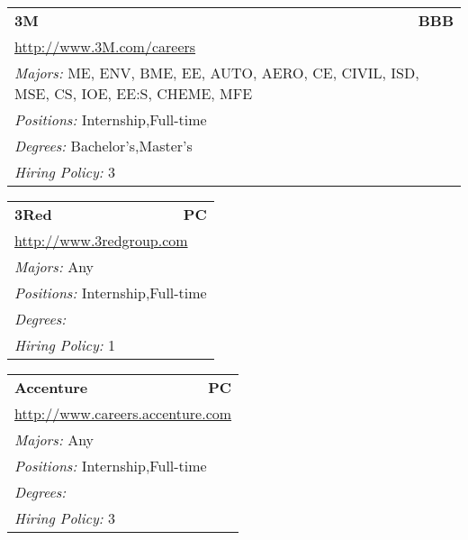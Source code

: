 \documentclass[twoside]{article}
\begin{document}
    \begin{center}\begin{multicols}{3}
    \begin{FlushLeft}
    \begin{minipage}{\columnwidth}\begin{tabularx}{.95\columnwidth}{Xr}
                 {\Large\bf 3M} & {\Large\bf BBB}\\
    \multicolumn{2}{p{.95\columnwidth}}{\url{http://www.3M.com/careers}}\\
    \multicolumn{2}{p{.95\columnwidth}}{\emph{Majors:} ME, ENV, BME, EE, AUTO, AERO, CE, CIVIL, ISD, MSE, CS, IOE, EE:S, CHEME, MFE}\\
    \multicolumn{2}{p{.95\columnwidth}}{\emph{Positions:} Internship,Full-time}\\
    \multicolumn{2}{p{.95\columnwidth}}{\emph{Degrees:} Bachelor's,Master's}\\
    \multicolumn{2}{p{.95\columnwidth}}{\emph{Hiring Policy:} 3}\\
    \end{tabularx}
    
\end{minipage}
 
\begin{minipage}{\columnwidth}\begin{tabularx}{.95\columnwidth}{Xr}
                 {\Large\bf 3Red} & {\Large\bf PC}\\
    \multicolumn{2}{p{.95\columnwidth}}{\url{http://www.3redgroup.com}}\\
    \multicolumn{2}{p{.95\columnwidth}}{\emph{Majors:} Any}\\
    \multicolumn{2}{p{.95\columnwidth}}{\emph{Positions:} Internship,Full-time}\\
    \multicolumn{2}{p{.95\columnwidth}}{\emph{Degrees:} }\\
    \multicolumn{2}{p{.95\columnwidth}}{\emph{Hiring Policy:} 1}\\
    \end{tabularx}
    
\end{minipage}
 
\begin{minipage}{\columnwidth}\begin{tabularx}{.95\columnwidth}{Xr}
                 {\Large\bf Accenture} & {\Large\bf PC}\\
    \multicolumn{2}{p{.95\columnwidth}}{\url{http://www.careers.accenture.com}}\\
    \multicolumn{2}{p{.95\columnwidth}}{\emph{Majors:} Any}\\
    \multicolumn{2}{p{.95\columnwidth}}{\emph{Positions:} Internship,Full-time}\\
    \multicolumn{2}{p{.95\columnwidth}}{\emph{Degrees:} }\\
    \multicolumn{2}{p{.95\columnwidth}}{\emph{Hiring Policy:} 3}\\
    \end{tabularx}
    

\end{minipage}
\end{FlushLeft}
\end{multicols}
\end{center}
\end{document}
